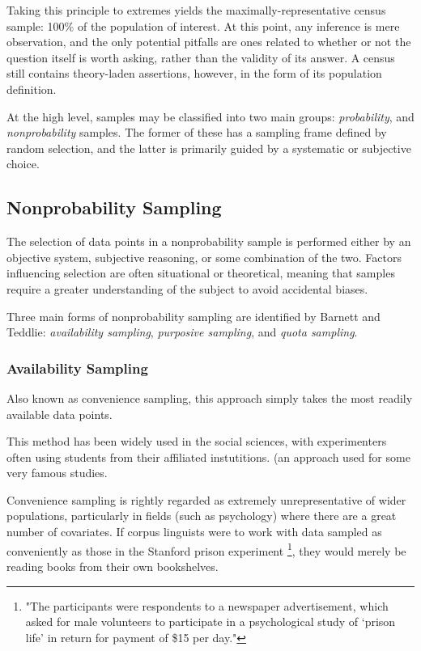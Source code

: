 Taking this principle to extremes yields the maximally-representative census sample: 100\% of the population of interest.  At this point, any inference is mere observation, and the only potential pitfalls are ones related to whether or not the question itself is worth asking, rather than the validity of its answer.  A census still contains theory-laden assertions, however, in the form of its population definition.


At the high level, samples may be classified into two main groups: \textsl{probability}, and \textsl{nonprobability} samples.  The former of these has a sampling frame defined by random selection, and the latter is primarily guided by a systematic or subjective choice.

\subsection{Nonprobability Sampling}
The selection of data points in a nonprobability sample is performed either by an objective system, subjective reasoning, or some combination of the two.  Factors influencing selection are often situational or theoretical, meaning that samples require a greater understanding of the subject to avoid accidental biases.  


Three main forms of nonprobability sampling are identified by Barnett\cite{barnett1991sample} and Teddlie\cite{Teddlie01012007}: \textsl{availability sampling}, \textsl{purposive sampling}, and \textsl{quota sampling}.

\subsubsection{Availability Sampling}
Also known as convenience sampling, this approach simply takes the most readily available data points.

This method has been widely used in the social sciences, with experimenters often using students from their affiliated instutitions.
(an approach used for some very famous studies.

Convenience sampling is rightly regarded as extremely unrepresentative of wider populations, particularly in fields (such as psychology) where there are a great number of covariates.  If corpus linguists were to work with data sampled as conveniently as those in the Stanford prison experiment \footnote{"The participants were respondents to a newspaper advertisement, which asked for male volunteers to participate in a psychological study of ‘prison life’ in return for payment of \$15 per day."}\cite{zimbardo1971stanford}, they would merely be reading books from their own bookshelves.

